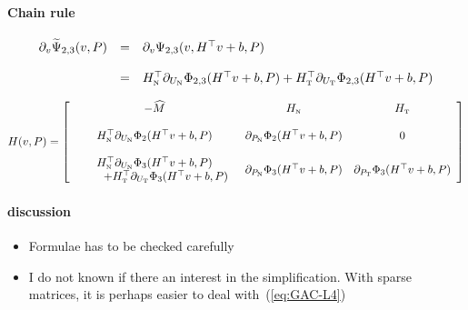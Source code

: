 \paragraph{Chain rule}
\begin{equation}
  \label{eq:chainrule1}
  \begin{array}{lcl}
  \partial_v \widetilde \Psi_{2,3}(v,P) &=&  \partial_v \Psi_{2,3}(v,H^\top v +b,P)  \\ \\
  &=& H_{{\hbox{\tiny{N}}}}^\top \partial_{U_{\hbox{\tiny{N}}}} \Phi_{2,3}(H^\top v + b,P) + H_{{\hbox{\tiny{T}}}}^\top \partial_{U_{\hbox{\tiny{T}}}} \Phi_{2,3}(H^\top v + b,P)
\end{array}
\end{equation}

\begin{equation}
  \label{eq:GAC-L6}
   H(v,P) =
   \left[\begin{array}{ccc}
       - \widehat M &   H_{{\hbox{\tiny{N}}}} & H_{{\hbox{\tiny{T}}}} \\ \\
       H_{{\hbox{\tiny{N}}}}^\top \partial_{U_{\hbox{\tiny{N}}}} \Phi_{2}(H^\top v + b,P) &   \partial_{P_{{\hbox{\tiny{N}}}}} \Phi_2(H^\top v + b,P) & 0 \\ \\
       \begin{array}{c}
         H_{{\hbox{\tiny{N}}}}^\top \partial_{U_{\hbox{\tiny{N}}}} \Phi_{3}(H^\top v + b,P) \\
         \quad \quad + H_{{\hbox{\tiny{T}}}}^\top \partial_{U_{\hbox{\tiny{T}}}} \Phi_{3}(H^\top v + b,P)\\
     \end{array}
     &  \partial_{P_{{\hbox{\tiny{N}}}}} \Phi_3(H^\top v + b,P)  & \partial_{P_{{\hbox{\tiny{T}}}}} \Phi_3(H^\top v + b,P)
   \end{array}\right]
\end{equation}

\paragraph{discussion}
\begin{itemize}
\item Formulae has to be checked carefully
\item I do not known if there an interest in the simplification. With sparse matrices, it is perhaps easier to deal with~(\ref{eq:GAC-L4})
\end{itemize}



